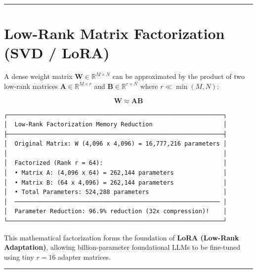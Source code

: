 \documentclass[
  letterpaper,
]{scrbook}
\begin{document}
\begin{center}\rule{0.5\linewidth}{0.5pt}\end{center}

\section{Low-Rank Matrix Factorization (SVD /
LoRA)}\label{low-rank-matrix-factorization-svd-lora}

A dense weight matrix \(\mathbf{W} \in \mathbb{R}^{M \times N}\) can be
approximated by the product of two low-rank matrices
\(\mathbf{A} \in \mathbb{R}^{M \times r}\) and
\(\mathbf{B} \in \mathbb{R}^{r \times N}\) where \(r \ll \min(M, N)\):

\[\mathbf{W} \approx \mathbf{A} \mathbf{B}\]

\begin{verbatim}
┌─────────────────────────────────────────────────────────────┐
│  Low-Rank Factorization Memory Reduction                    │
├─────────────────────────────────────────────────────────────┤
│  Original Matrix: W (4,096 x 4,096) = 16,777,216 parameters │
│                                                             │
│  Factorized (Rank r = 64):                                  │
│  • Matrix A: (4,096 x 64) = 262,144 parameters              │
│  • Matrix B: (64 x 4,096) = 262,144 parameters              │
│  • Total Parameters: 524,288 parameters                     │
│  ────────────────────────────────────────────────────────── │
│  Parameter Reduction: 96.9% reduction (32x compression)!    │
└─────────────────────────────────────────────────────────────┘
\end{verbatim}

This mathematical factorization forms the foundation of \textbf{LoRA
(Low-Rank Adaptation)}, allowing billion-parameter foundational LLMs to
be fine-tuned using tiny \(r=16\) adapter matrices.

\begin{center}\rule{0.5\linewidth}{0.5pt}\end{center}
\end{document}

